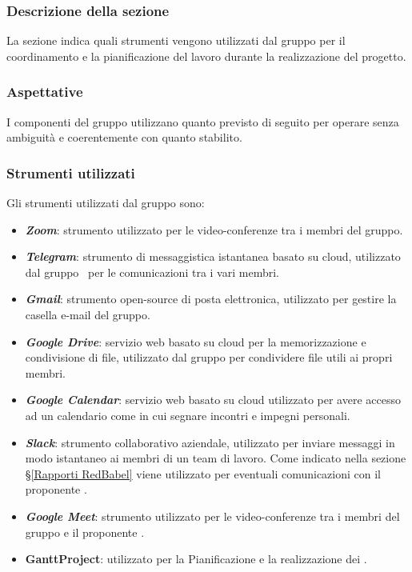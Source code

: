 \subsubsection{Descrizione della sezione}
La sezione indica quali strumenti vengono utilizzati dal gruppo per il coordinamento e la pianificazione del lavoro durante la realizzazione del progetto.
\subsubsection{Aspettative}
I componenti del gruppo utilizzano quanto previsto di seguito per operare senza ambiguità e coerentemente con quanto stabilito.
\subsubsection{Strumenti utilizzati}
Gli strumenti utilizzati dal gruppo sono:
\begin{itemize}
	\item \textbf{\textit{Zoom}}: strumento utilizzato per le video-conferenze tra i membri del gruppo.
	\item \textbf{\textit{Telegram}}: strumento di messaggistica istantanea basato su cloud, utilizzato dal gruppo \Gruppo\ per le comunicazioni tra i vari membri.
	\item \textbf{\textit{Gmail}}: strumento open-source di posta elettronica, utilizzato per gestire la casella e-mail del gruppo.
	\item \textbf{\textit{Google Drive}}: servizio web basato su cloud per la memorizzazione e condivisione di file, utilizzato dal gruppo per condividere file utili ai propri membri.
	\item \textbf{\textit{Google Calendar}}: servizio web basato su cloud utilizzato per avere accesso ad un calendario come in cui segnare incontri e impegni personali.
	\item \textbf{\textit{Slack}}: strumento collaborativo aziendale, utilizzato per inviare messaggi in modo istantaneo ai membri di un team di lavoro. Come indicato nella sezione \S\ref{Rapporti RedBabel} viene utilizzato per eventuali comunicazioni con il proponente \Proponente.
	\item \textbf{\textit{Google Meet}}: strumento utilizzato per le video-conferenze tra i membri del gruppo e il proponente \Proponente.
	\item \textbf{GanttProject}: utilizzato per la Pianificazione e la realizzazione dei . 
\end{itemize}

